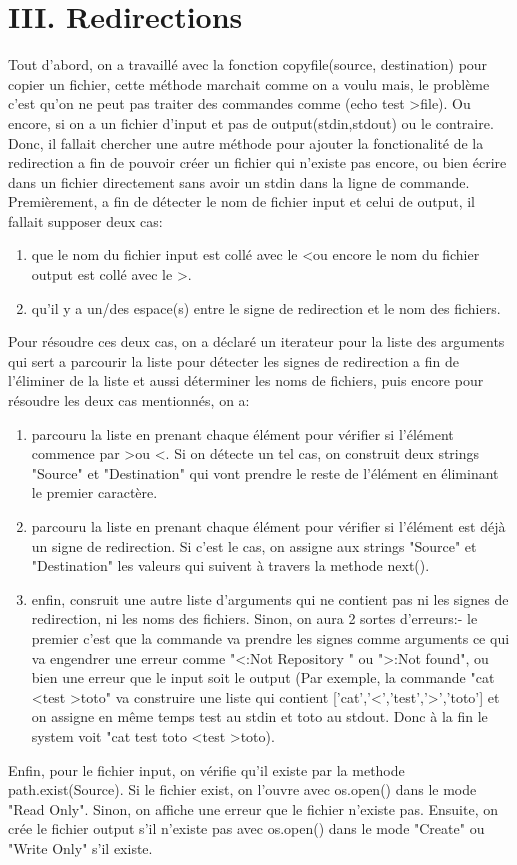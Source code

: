 \documentclass{article}
\begin{document}
\section*{III. Redirections}
	Tout d'abord, on a travaillé avec la fonction copyfile(source, destination) pour copier un fichier, cette méthode marchait comme on a voulu mais, le problème c'est qu'on ne peut pas traiter des commandes comme (echo test \textgreater file). Ou encore, si on a un fichier d'input et pas de output(stdin,stdout) ou le contraire. Donc, il fallait chercher une autre méthode pour ajouter la fonctionalité de la redirection a fin de pouvoir créer un fichier qui n'existe pas encore, ou bien écrire dans un fichier directement sans avoir un stdin dans la ligne de commande. 
	Premièrement, a fin de détecter le nom de fichier input et celui de output, il fallait supposer deux cas:
\begin{enumerate}
\item que le nom du fichier input est collé avec le \textless ou encore le nom du fichier output est collé avec le \textgreater.
\item qu'il y a un/des espace(s) entre le signe de redirection et le nom des fichiers.
\end{enumerate}
	Pour résoudre ces deux cas, on a déclaré un iterateur pour la liste des arguments qui sert a parcourir la liste pour détecter les signes de redirection a fin de l'éliminer de la liste et aussi déterminer les noms de fichiers, puis encore pour résoudre les deux cas mentionnés, on a:
\begin{enumerate}
\item parcouru la liste en prenant chaque élément pour vérifier si l'élément commence par \textgreater \space  ou  \textless. Si on détecte un tel cas, on construit deux strings "Source" et "Destination" qui vont prendre le reste de l'élément en éliminant le premier caractère.
\item parcouru la liste en prenant chaque élément pour vérifier si l'élément est déjà un signe de redirection. Si c'est le cas, on assigne aux strings "Source" et "Destination" les valeurs qui suivent à travers la methode next().
\item enfin, consruit une autre liste d'arguments qui ne contient pas ni les signes de redirection, ni les noms des fichiers. Sinon, on aura 2 sortes d'erreurs:- le premier c'est que la commande va prendre les signes comme arguments ce qui va engendrer une erreur comme "\textless:Not Repository " ou "\textgreater:Not found", ou bien une erreur que le input soit le output (Par exemple, la commande "cat \textless \space test \textgreater \space toto" va construire une liste qui contient ['cat','\textless','test','\textgreater','toto'] et on assigne en même temps test au stdin et toto au stdout. Donc à la fin le system voit "cat test toto \textless test \textgreater toto).
\end{enumerate}
	Enfin, pour le fichier input, on vérifie qu'il existe par la methode path.exist(Source). Si le fichier exist, on l'ouvre avec os.open() dans le mode "Read Only". Sinon, on affiche une erreur que le fichier n'existe pas. Ensuite, on crée le fichier output s'il n'existe pas avec os.open() dans le mode "Create" ou "Write Only" s'il existe.
\end{document}

